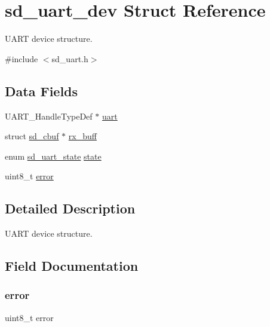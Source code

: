 \hypertarget{structsd__uart__dev}{}\section{sd\+\_\+uart\+\_\+dev Struct Reference}
\label{structsd__uart__dev}


U\+A\+RT device structure.  




{\ttfamily \#include $<$sd\+\_\+uart.\+h$>$}

\subsection*{Data Fields}
\begin{DoxyCompactItemize}
\item 
U\+A\+R\+T\+\_\+\+Handle\+Type\+Def $\ast$ \mbox{\hyperlink{structsd__uart__dev_a31b2a452cffe839ac4a3bf86eddc16b0}{uart}}
\item 
struct \mbox{\hyperlink{structsd__cbuf}{sd\+\_\+cbuf}} $\ast$ \mbox{\hyperlink{structsd__uart__dev_a2bc17c33f4234299b83ba5d98edd5887}{rx\+\_\+buff}}
\item 
enum \mbox{\hyperlink{group___s_d___u_a_r_t___types_gaf0b8536f812b898a674880b74843b6da}{sd\+\_\+uart\+\_\+state}} \mbox{\hyperlink{structsd__uart__dev_a446351924c8cae5f6254f777f8924cd2}{state}}
\item 
uint8\+\_\+t \mbox{\hyperlink{structsd__uart__dev_adc64ccb7538429fe78e3fe0139267370}{error}}
\end{DoxyCompactItemize}


\subsection{Detailed Description}
U\+A\+RT device structure. 

\subsection{Field Documentation}
\mbox{\label{structsd__uart__dev_adc64ccb7538429fe78e3fe0139267370}} 
\subsubsection{\texorpdfstring{error}{error}}
{\footnotesize\ttfamily uint8\+\_\+t error}

